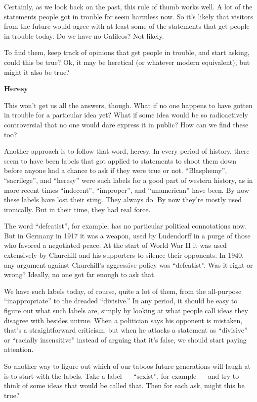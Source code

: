 \documentclass[12pt]{book}
\begin{document}
Certainly, as we look back on the past, this rule of thumb works well. A
lot of the statements people got in trouble for seem harmless now. So
it's likely that visitors from the future would agree with at least some
of the statements that get people in trouble today. Do we have no
Galileos? Not likely.

To find them, keep track of opinions that get people in trouble, and
start asking, could this be true? Ok, it may be heretical (or whatever
modern equivalent), but might it also be true?

\textbf{Heresy}

This won't get us all the answers, though. What if no one happens to
have gotten in trouble for a particular idea yet? What if some idea
would be so radioactively controversial that no one would dare express
it in public? How can we find these too?

Another approach is to follow that word, heresy. In every period of
history, there seem to have been labels that got applied to statements
to shoot them down before anyone had a chance to ask if they were true
or not. ``Blasphemy'', ``sacrilege'', and ``heresy'' were such labels
for a good part of western history, as in more recent times
``indecent'', ``improper'', and ``unamerican'' have been. By now these
labels have lost their sting. They always do. By now they're mostly used
ironically. But in their time, they had real force.

The word ``defeatist'', for example, has no particular political
connotations now. But in Germany in 1917 it was a weapon, used by
Ludendorff in a purge of those who favored a negotiated peace. At the
start of World War II it was used extensively by Churchill and his
supporters to silence their opponents. In 1940, any argument against
Churchill's aggressive policy was ``defeatist''. Was it right or wrong?
Ideally, no one got far enough to ask that.

We have such labels today, of course, quite a lot of them, from the
all-purpose ``inappropriate'' to the dreaded ``divisive.'' In any
period, it should be easy to figure out what such labels are, simply by
looking at what people call ideas they disagree with besides untrue.
When a politician says his opponent is mistaken, that's a
straightforward criticism, but when he attacks a statement as
``divisive'' or ``racially insensitive'' instead of arguing that it's
false, we should start paying attention.

So another way to figure out which of our taboos future generations will
laugh at is to start with the labels. Take a label --- ``sexist'', for
example --- and try to think of some ideas that would be called that.
Then for each ask, might this be true?
\end{document}
